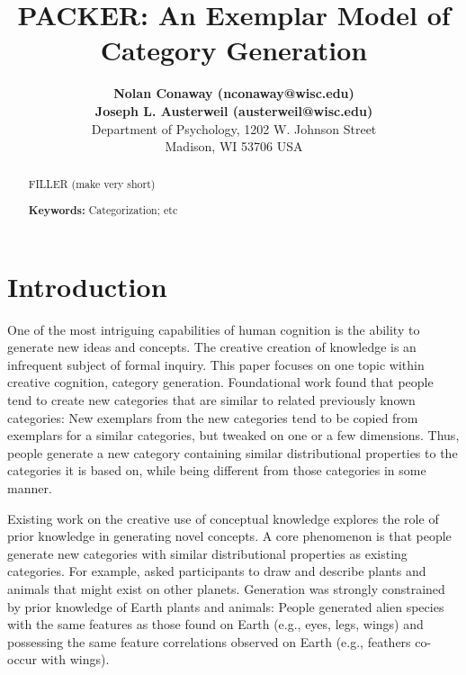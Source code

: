 \documentclass[10pt,letterpaper]{article}
\title{PACKER: An Exemplar Model of Category Generation}
\author{
{ \large \bf Nolan Conaway (nconaway@wisc.edu) } \\
{ \large \bf Joseph L. Austerweil (austerweil@wisc.edu) } \\
Department of Psychology, 1202 W. Johnson Street \\
Madison, WI 53706 USA
}
\begin{document}
\maketitle

\begin{abstract}
FILLER (make very short)

\textbf{Keywords:} 
Categorization; etc
\end{abstract}

\section{Introduction}

One of the most intriguing capabilities of human cognition is the ability to generate new ideas and concepts. The creative creation of knowledge is an infrequent subject of formal inquiry. This paper focuses on one topic within creative cognition, category generation. Foundational work \citep[e.g.,][]{smith1993constraining,ward2002role,ward1994structured,ward1995s} found that people tend to create new categories that are similar to related previously known categories: New exemplars from the new categories tend to be copied from exemplars for a similar categories, but tweaked on one or a few dimensions. Thus, people generate a new category containing similar distributional properties to the categories it is based on, while being different from those categories in some manner. 

Existing work on the creative use of conceptual knowledge  explores the role of prior knowledge in generating novel concepts. A core phenomenon is that people generate new categories with similar distributional properties as existing categories. For example, \citet{ward1994structured} asked participants to draw and describe plants and animals that might exist on other planets. Generation was strongly constrained by prior knowledge of Earth plants and animals: People generated alien species with the same features as those found on Earth (e.g., eyes, legs, wings) and possessing the same feature correlations observed on Earth (e.g., feathers co-occur with wings). 
\end{document}
